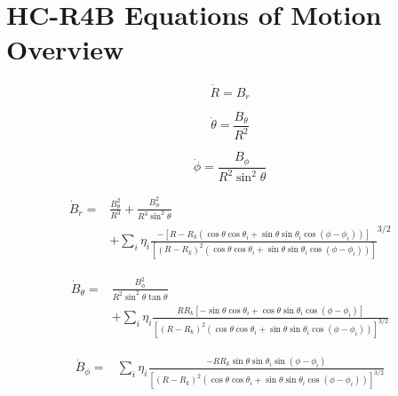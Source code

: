 \chapter{HC-R4B Equations of Motion Overview} \label{apx:hcr4b-overview}

\begin{equation} \tag{2.67}
    \boxed{
            \dot{R} = B_r
    }
\end{equation}


\begin{equation} \tag{2.72}
    \boxed{
            \dot{\theta} = \frac{B_\theta}{R^2}
    }
\end{equation}


\begin{equation} \tag{2.76}
    \boxed{
            \dot{\phi} = \frac{B_\phi}{R^2 \sin^2{\theta}}
    }
\end{equation}


\begin{equation} \tag{2.86}
    \boxed{
        \!\begin{aligned}
        \dot{B}_r = &\frac{B_\theta^2}{R^3} + \frac{B_\phi^2}{R^3 \sin^2{\theta}} \\
        & + \sum\limits_{i} \eta_i \frac{-\left[R - R_k \left(\cos{\theta}\cos{\theta_i} + \sin{\theta}\sin{\theta_i}\cos{(\phi - \phi_i)}\right) \right]}{\left[(R - R_k)^2 \left(\cos{\theta}\cos{\theta_i} + \sin{\theta}\sin{\theta_i}\cos{(\phi - \phi_i)} \right) \right]}^{3/2}
        \end{aligned}
    }
\end{equation}


\begin{equation} \tag{2.87}
    \boxed{
        \!\begin{aligned}
            \dot{B}_\theta = &\frac{B_\phi^2}{R^2 \sin^2{\theta} \tan{\theta}} \\
            &+ \sum\limits_{i} \eta_i \frac{R R_k \left[-\sin{\theta}\cos{\theta_i} + \cos{\theta}\sin{\theta_i}\cos{(\phi - \phi_i)} \right]}{\left[(R - R_k)^2 \left(\cos{\theta}\cos{\theta_i} + \sin{\theta}\sin{\theta_i}\cos{(\phi - \phi_i)} \right) \right]^{3/2}}
        \end{aligned}
    }
\end{equation}


\begin{equation} \tag{2.88}
    \boxed{
        \!\begin{aligned}
            \dot{B}_\phi = &\sum\limits_{i} \eta_i \frac{- R R_k \sin{\theta}\sin{\theta_i}\sin{(\phi - \phi_i)}}{\left[(R - R_k)^2 \left(\cos{\theta}\cos{\theta_i} + \sin{\theta}\sin{\theta_i}\cos{(\phi - \phi_i)} \right) \right]^{3/2}}
        \end{aligned}
    }
\end{equation}
